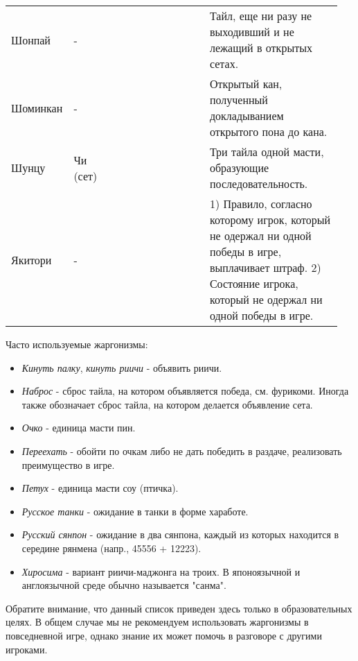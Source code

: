 \begin{tabularx}{\linewidth}{|L{0.14\linewidth}|L{0.13\linewidth}|L{0.1\linewidth}|L{0.18\linewidth}|L{0.4\linewidth}|}
	Шонпай & - &  &  & Тайл, еще ни разу не выходивший и не лежащий в открытых сетах. \\
	Шоминкан & - &  &  & Открытый кан, полученный докладыванием открытого пона до кана. \\
	Шунцу & Чи (сет) &  &  & Три тайла одной масти, образующие последовательность. \\
	Якитори & - &  &  & 1) Правило, согласно которому игрок, который не одержал ни одной победы в игре, выплачивает штраф. 2) Состояние игрока, который не одержал ни одной победы в игре. \\
\end{tabularx}

Часто используемые жаргонизмы:
\begin{itemize}
	\item \textit{Кинуть палку}, \textit{кинуть риичи} - объявить риичи.
	\item \textit{Наброс} - сброс тайла, на котором объявляется победа, см. фурикоми. Иногда также обозначает сброс тайла, на котором делается объявление сета.
	\item \textit{Очко} - единица масти пин.
	\item \textit{Переехать} - обойти по очкам либо не дать победить в раздаче, реализовать преимущество в игре.
	\item \textit{Петух} - единица масти соу (птичка).
	\item \textit{Русское танки} - ожидание в танки в форме хаработе.
	\item \textit{Русский сянпон} - ожидание в два сянпона, каждый из которых находится в середине рянмена (напр., 45556 + 12223).
	\item \textit{Хиросима} - вариант риичи-маджонга на троих. В японоязычной и англоязычной среде обычно называется "санма".
\end{itemize}
	
Обратите внимание, что данный список приведен здесь только в образовательных целях. В общем случае мы не рекомендуем использовать жаргонизмы в повседневной игре, однако знание их может помочь в разговоре с другими игроками.
